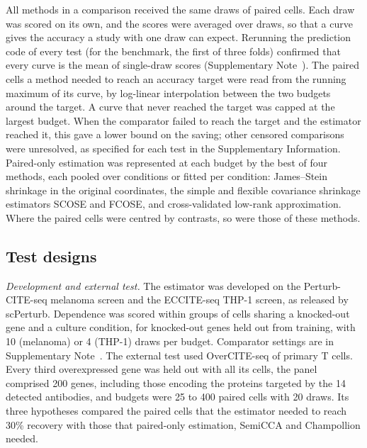 \documentclass[pdflatex,sn-vancouver-num,iicol]{sn-jnl}
\begin{document}
All methods in a comparison received the same draws of paired cells. Each draw was scored on its own, and the scores were averaged over draws, so that a curve gives the accuracy a study with one draw can expect. Rerunning the prediction code of every test (for the benchmark, the first of three folds) confirmed that every curve is the mean of single-draw scores (Supplementary Note~). The paired cells a method needed to reach an accuracy target were read from the running maximum of its curve, by log-linear interpolation between the two budgets around the target. A curve that never reached the target was capped at the largest budget. When the comparator failed to reach the target and the estimator reached it, this gave a lower bound on the saving; other censored comparisons were unresolved, as specified for each test in the Supplementary Information. Paired-only estimation was represented at each budget by the best of four methods, each pooled over conditions or fitted per condition: James--Stein shrinkage in the original coordinates, the simple and flexible covariance shrinkage estimators SCOSE and FCOSE\cite{muandet2014,ramdas2015}, and cross-validated low-rank approximation. Where the paired cells were centred by contrasts, so were those of these methods.

\subsection{Test designs}
\textit{Development and external test.} The estimator was developed on the Perturb-CITE-seq melanoma screen\cite{frangieh2021} and the ECCITE-seq THP-1 screen\cite{papalexi2021}, as released by scPerturb\cite{peidli2024}. Dependence was scored within groups of cells sharing a knocked-out gene and a culture condition, for knocked-out genes held out from training, with 10 (melanoma) or 4 (THP-1) draws per budget. Comparator settings are in Supplementary Note~. The external test used OverCITE-seq of primary T cells\cite{legut2022}. Every third overexpressed gene was held out with all its cells, the panel comprised 200 genes, including those encoding the proteins targeted by the 14 detected antibodies, and budgets were 25 to 400 paired cells with 20 draws. Its three hypotheses compared the paired cells that the estimator needed to reach 30\% recovery with those that paired-only estimation, SemiCCA and Champollion needed.
\end{document}
